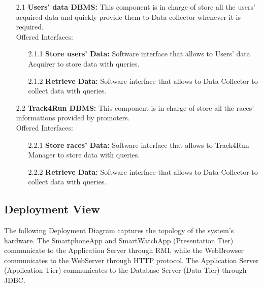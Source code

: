 \begin{enumerate}
	\begin{enumerate}
	\item [2.1]\textbf{Users’ data DBMS:}
	This component is in charge of store all the users’ acquired data and quickly provide them to Data collector whenever it is required.\\Offered Interfaces:
		\begin{enumerate}
		\item [2.1.1] \textbf{Store users' Data:} Software interface that allows to Users’ data Acquirer to store data with queries.
		\item [2.1.2] \textbf{Retrieve Data:} Software interface that allows to Data Collector to collect data with queries.
		\end{enumerate}	
	
	\item [2.2]\textbf{Track4Run DBMS:}
	This component is in charge of store all the races' informations provided by promoters.\\Offered Interfaces:
		\begin{enumerate}
		\item [2.2.1] \textbf{Store races' Data:} Software interface that allows to Track4Run Manager to store data with queries.
		\item [2.2.2] \textbf{Retrieve Data:} Software interface that allows to Data Collector to collect data with queries.
		\end{enumerate}	
	
	\end{enumerate}

\end{enumerate}


\subsection{Deployment View}
The following Deployment Diagram captures the topology of the system's hardware.
The SmartphoneApp and SmartWatchApp (Presentation Tier) communicate to the Application Server through RMI, while the WebBrowser communicates to the WebServer through HTTP protocol. The Application Server (Application Tier) communicates to the Database Server (Data Tier) through JDBC.

